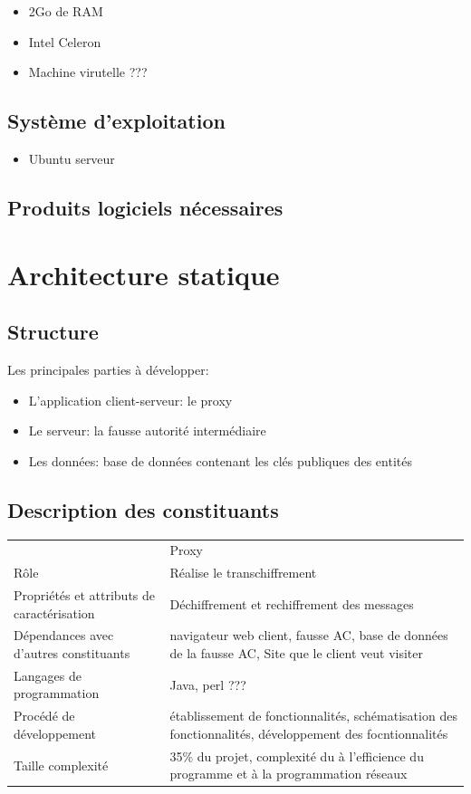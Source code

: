 \documentclass[a4paper,11pt,french]{article}
\begin{document}
\begin{itemize}
\item 2Go de RAM
\item Intel Celeron
\item Machine virutelle ???
\end{itemize}

\subsection{Système d'exploitation}

\begin{itemize}
\item Ubuntu serveur
\end{itemize}

\subsection{Produits logiciels nécessaires}

\section{Architecture statique}

\subsection{Structure}
Les principales parties à développer:
\begin{itemize}
\item L'application client-serveur: le proxy
\item Le serveur: la fausse autorité intermédiaire
\item Les données: base de données contenant les clés publiques des entités
\end{itemize}


\subsection{Description des constituants}

\begin{tabular}{ll}
	 & Proxy\\
	Rôle & Réalise le transchiffrement\\
	Propriétés et attributs de caractérisation & Déchiffrement et rechiffrement des messages\\
	Dépendances avec d'autres constituants & navigateur web client, fausse AC, base de données de la fausse AC, Site que le client veut visiter\\
	Langages de programmation & Java, perl ???\\
	Procédé de développement & établissement de fonctionnalités, schématisation des fonctionnalités, développement des focntionnalités\\
	Taille complexité & 35\% du projet, complexité du à l'efficience du programme et à la programmation réseaux\\
\end{tabular}
\end{document}
